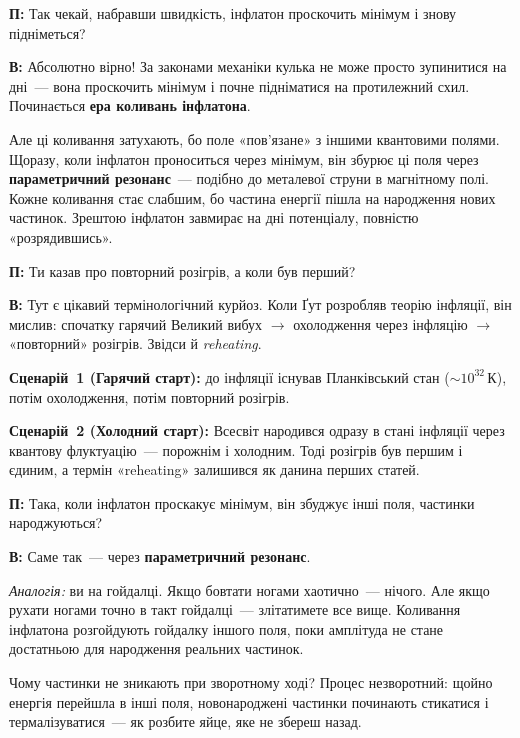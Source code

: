 \documentclass[12pt, a4paper]{article}
\newcommand{\Q}[1]{%
    \begin{questionbox}
        {\color{qcolor}\bfseries\sffamily П:} #1
    \end{questionbox}
}
\newcommand{\A}[1]{%
    \begin{answerbox}
        {\bfseries\sffamily В:} #1
    \end{answerbox}
}
\begin{document}

\Q{Так чекай, набравши швидкість, інфлатон проскочить мінімум і знову підніметься?}

\A{Абсолютно вірно! За законами механіки кулька не може просто зупинитися на дні~--- вона проскочить мінімум і почне підніматися на протилежний схил. Починається \textbf{ера коливань інфлатона}.

Але ці коливання затухають, бо поле «пов'язане» з іншими квантовими полями. Щоразу, коли інфлатон проноситься через мінімум, він збурює ці поля через \textbf{параметричний резонанс}~--- подібно до металевої струни в магнітному полі. Кожне коливання стає слабшим, бо частина енергії пішла на народження нових частинок. Зрештою інфлатон завмирає на дні потенціалу, повністю «розрядившись».}


\Q{Ти казав про повторний розігрів, а коли був перший?}

\A{Тут є цікавий термінологічний курйоз. Коли Ґут розробляв теорію інфляції, він мислив: спочатку гарячий Великий вибух $\to$ охолодження через інфляцію $\to$ «повторний» розігрів. Звідси й \emph{reheating}.

\textbf{Сценарій~1 (Гарячий старт):} до інфляції існував Планківський стан ($\sim10^{32}$\,К), потім охолодження, потім повторний розігрів.

\textbf{Сценарій~2 (Холодний старт):} Всесвіт народився одразу в стані інфляції через квантову флуктуацію~--- порожнім і холодним. Тоді розігрів був першим і єдиним, а термін «reheating» залишився як данина перших статей.}


\Q{Така, коли інфлатон проскакує мінімум, він збуджує інші поля, частинки народжуються?}

\A{Саме так~--- через \textbf{параметричний резонанс}.

\textit{Аналогія:} ви на гойдалці. Якщо бовтати ногами хаотично~--- нічого. Але якщо рухати ногами точно в такт гойдалці~--- злітатимете все вище. Коливання інфлатона розгойдують гойдалку іншого поля, поки амплітуда не стане достатньою для народження реальних частинок.

Чому частинки не зникають при зворотному ході? Процес незворотний: щойно енергія перейшла в інші поля, новонароджені частинки починають стикатися і термалізуватися~--- як розбите яйце, яке не збереш назад.}
\end{document}
